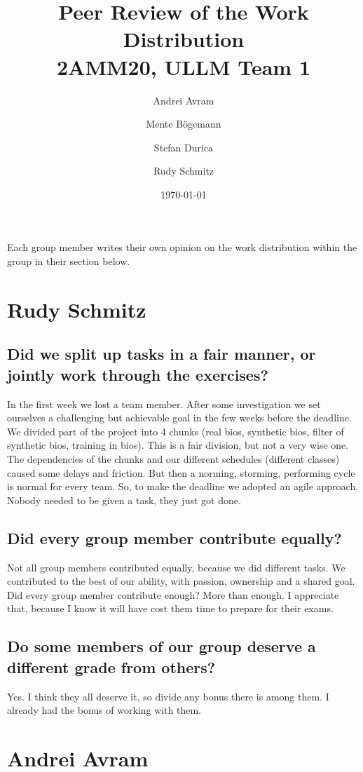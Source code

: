 \documentclass[11pt]{article}
\title{Peer Review of the Work Distribution\\\large 2AMM20, ULLM Team 1}
\author{Andrei Avram \and Mente B\"ogemann \and Stefan Durica \and Rudy Schmitz}
\date{\today}
\begin{document}
\maketitle

Each group member writes their own opinion on the work distribution within the group in their section below.

\section{Rudy Schmitz}

\subsection{Did we split up tasks in a fair manner, or jointly work through the exercises?}
In the first week we lost a team member. After some investigation we set ourselves a challenging but achievable goal in the few weeks before the deadline. We divided part of the project into 4 chunks (real bios, synthetic bios, filter of synthetic bios, training in bios).
This is a fair division, but not a very wise one. The dependencies of the chunks and our different schedules (different classes) caused some delays and friction. But then a norming, storming, performing cycle is normal for every team. So, to make the deadline we adopted an agile approach. Nobody needed to be given a task, they just got done.

\subsection{Did every group member contribute equally?}
Not all group members contributed equally, because we did different tasks. We contributed to the best of our ability, with passion, ownership and a shared goal. Did every group member contribute enough? More than enough. I appreciate that, because I know it will have cost them time to prepare for their exams.

\subsection{Do some members of our group deserve a different grade from others?}
Yes. I think they all deserve it, so divide any bonus there is among them. I already had the bonus of working with them.

\section{Andrei Avram}
\end{document}
